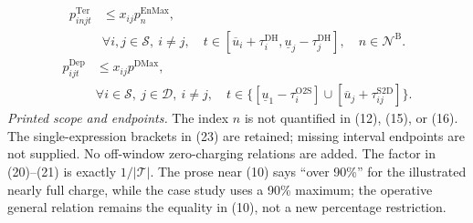 \documentclass{article}
\begin{document}
\begin{equation}
\begin{aligned}
p^{\mathrm{Ter}}_{injt}&\leq x_{ij}p_n^{\mathrm{EnMax}},\\
&\forall i,j\in\mathcal S,\ i\ne j,\quad
 t\in[\overline u_i+\tau_i^{\mathrm{DH}},\underline u_j-\tau_j^{\mathrm{DH}}],\quad
 n\in\mathcal N^{\mathrm B}.
\end{aligned}\tag{22}
\end{equation}
\begin{equation}
\begin{aligned}
p^{\mathrm{Dep}}_{ijt}&\leq x_{ij}p^{\mathrm{DMax}},\\
&\forall i\in\mathcal S,\ j\in\mathcal D,\ i\ne j,\quad
 t\in\{[\underline u_1-\tau_i^{\mathrm{O2S}}]\cup[\overline u_j+\tau_{ij}^{\mathrm{S2D}}]\}.
\end{aligned}\tag{23}
\end{equation}
\noindent\emph{Printed scope and endpoints.} The index \(n\) is not quantified in (12), (15), or (16). The single-expression brackets in (23) are retained; missing interval endpoints are not supplied. No off-window zero-charging relations are added. The factor in (20)--(21) is exactly \(1/|\mathcal T|\). The prose near (10) says ``over 90\%'' for the illustrated nearly full charge, while the case study uses a 90\% maximum; the operative general relation remains the equality in (10), not a new percentage restriction.
\end{document}
